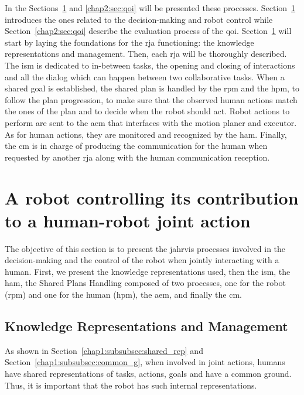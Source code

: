 \documentclass[a4paper,11pt,twoside]{StyleThese}
\begin{document}
In the Sections~\ref{chap2:sec:control} and \ref{chap2:sec:qoi} will be presented these processes. Section~\ref{chap2:sec:control} introduces the ones related to the decision-making and robot control while Section~\ref{chap2:sec:qoi} describe the evaluation process of the \acrlong{qoi}. Section~\ref{chap2:sec:control} will start by laying the foundations for the \acrshort{rja} functioning: the knowledge representations and management. Then, each \acrshort{rja} will be thoroughly described. The \acrfull{ism} is dedicated to in-between tasks, \ie the opening and closing of interactions and all the dialog which can happen between two collaborative tasks. When a shared goal is established, the shared plan is handled by the \acrfull{rpm} and the \acrfull{hpm}, \ie to follow the plan progression, to make sure that the observed human actions match the ones of the plan and to decide when the robot should act. Robot actions to perform are sent to the \acrfull{aem} that interfaces with the motion planer and executor. As for human actions, they are monitored and recognized by the \acrfull{ham}. Finally, the \acrfull{cm} is in charge of producing the communication for the human when requested by another \acrshort{rja} along with the human communication reception.


\section{A robot controlling its contribution to a human-robot joint action}\label{chap2:sec:control}

The objective of this section is to present the \acrshort{jahrvis} processes involved in the decision-making and the control of the robot when jointly interacting with a human. First, we present the knowledge representations used, then the \acrlong{ism}, the \acrlong{ham}, the Shared Plans Handling composed of two processes, one for the robot (\acrlong{rpm}) and one for the human (\acrlong{hpm}), the \acrlong{aem}, and finally the \acrlong{cm}.

\subsection{Knowledge Representations and Management}\label{chap2:subsec:know}
As shown in Section~\ref{chap1:subsubsec:shared_rep} and Section~\ref{chap1:subsubsec:common_g}, when involved in joint actions, humans have shared representations of tasks, actions, goals and have a common ground. Thus, it is important that the robot has such internal representations.
\end{document}
